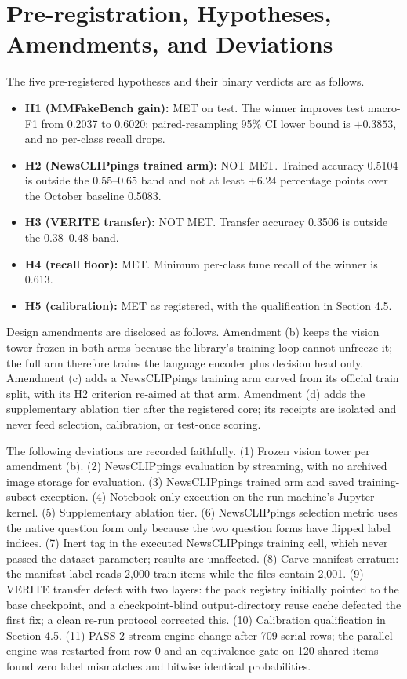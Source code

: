 \documentclass{article} %
\begin{document}



\appendix
\section{Pre-registration, Hypotheses, Amendments, and Deviations}
\label{app:protocol}
The five pre-registered hypotheses and their binary verdicts are as follows.
\begin{itemize}
    \item \textbf{H1 (MMFakeBench gain):} MET on test. The winner improves test macro-F1 from 0.2037 to 0.6020; paired-resampling 95\% CI lower bound is \(+0.3853\), and no per-class recall drops.
    \item \textbf{H2 (NewsCLIPpings trained arm):} NOT MET. Trained accuracy 0.5104 is outside the \(0.55\)--\(0.65\) band and not at least \(+6.24\) percentage points over the October baseline 0.5083.
    \item \textbf{H3 (VERITE transfer):} NOT MET. Transfer accuracy 0.3506 is outside the \(0.38\)--\(0.48\) band.
    \item \textbf{H4 (recall floor):} MET. Minimum per-class tune recall of the winner is 0.613.
    \item \textbf{H5 (calibration):} MET as registered, with the qualification in Section 4.5.
\end{itemize}

Design amendments are disclosed as follows. Amendment (b) keeps the vision tower frozen in both arms because the library's training loop cannot unfreeze it; the full arm therefore trains the language encoder plus decision head only. Amendment (c) adds a NewsCLIPpings training arm carved from its official train split, with its H2 criterion re-aimed at that arm. Amendment (d) adds the supplementary ablation tier after the registered core; its receipts are isolated and never feed selection, calibration, or test-once scoring.

The following deviations are recorded faithfully. (1) Frozen vision tower per amendment (b). (2) NewsCLIPpings evaluation by streaming, with no archived image storage for evaluation. (3) NewsCLIPpings trained arm and saved training-subset exception. (4) Notebook-only execution on the run machine's Jupyter kernel. (5) Supplementary ablation tier. (6) NewsCLIPpings selection metric uses the native question form only because the two question forms have flipped label indices. (7) Inert tag in the executed NewsCLIPpings training cell, which never passed the dataset parameter; results are unaffected. (8) Carve manifest erratum: the manifest label reads 2,000 train items while the files contain 2,001. (9) VERITE transfer defect with two layers: the pack registry initially pointed to the base checkpoint, and a checkpoint-blind output-directory reuse cache defeated the first fix; a clean re-run protocol corrected this. (10) Calibration qualification in Section 4.5. (11) PASS 2 stream engine change after 709 serial rows; the parallel engine was restarted from row 0 and an equivalence gate on 120 shared items found zero label mismatches and bitwise identical probabilities.
\end{document}
